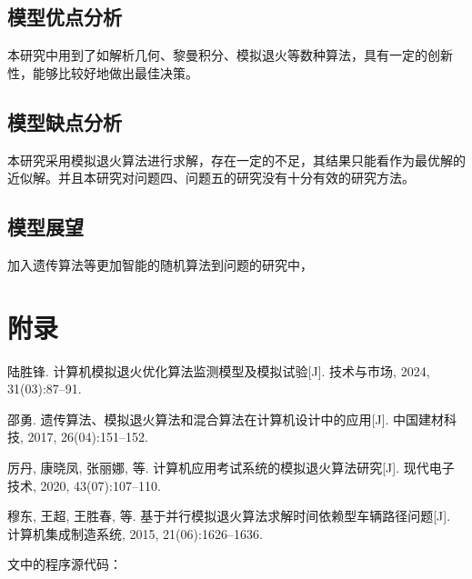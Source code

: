 \documentclass{article}
\begin{document}
\subsection{模型优点分析}

本研究中用到了如解析几何、黎曼积分、模拟退火等数种算法，具有一定的创新性，能够比较好地做出最佳决策。

\subsection{模型缺点分析}
本研究采用模拟退火算法进行求解，存在一定的不足，其结果只能看作为最优解的近似解。并且本研究对问题四、问题五的研究没有十分有效的研究方法。

\subsection{模型展望}
加入遗传算法等更加智能的随机算法到问题的研究中，



\section*{附录}
\vspace{-1em}
\begin{thebibliography}{99}

陆胜锋. 计算机模拟退火优化算法监测模型及模拟试验[J]. 技术与市场, 2024, 31(03):87--91.

邵勇. 遗传算法、模拟退火算法和混合算法在计算机设计中的应用[J]. 中国建材科技, 2017, 26(04):151--152.

厉丹, 康晓凤, 张丽娜, 等. 计算机应用考试系统的模拟退火算法研究[J]. 现代电子技术, 2020, 43(07):107--110.

穆东, 王超, 王胜春, 等. 基于并行模拟退火算法求解时间依赖型车辆路径问题[J]. 计算机集成制造系统, 2015, 21(06):1626--1636.

\end{thebibliography}

文中的程序源代码：

\noindent
\end{document}
